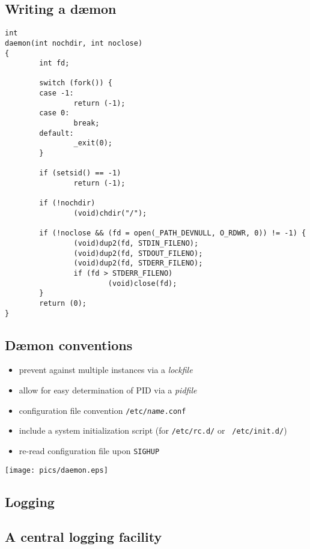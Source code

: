 \documentclass[xga]{xdvislides}
\begin{document}
\subsection{Writing a d\ae mon}
\small
\begin{verbatim}
int
daemon(int nochdir, int noclose)
{
        int fd;

        switch (fork()) {
        case -1:
                return (-1);
        case 0:
                break;
        default:
                _exit(0);
        }

        if (setsid() == -1)
                return (-1);

        if (!nochdir)
                (void)chdir("/");

        if (!noclose && (fd = open(_PATH_DEVNULL, O_RDWR, 0)) != -1) {
                (void)dup2(fd, STDIN_FILENO);
                (void)dup2(fd, STDOUT_FILENO);
                (void)dup2(fd, STDERR_FILENO);
                if (fd > STDERR_FILENO)
                        (void)close(fd);
        }
        return (0);
}
\end{verbatim}
\Normalsize

\subsection{D\ae mon conventions}
\begin{itemize}
	\item prevent against multiple instances via a {\em lockfile}
	\item allow for easy determination of PID via a {\em pidfile}
	\item configuration file convention {\tt /etc/{\em name}.conf}
	\item include a system initialization script (for {\tt /etc/rc.d/} or {\tt
		/etc/init.d/})
	\item re-read configuration file upon {\tt SIGHUP}
\end{itemize}

\vfill
\hfill\texttt{[image: pics/daemon.eps]} \\


\subsection{Logging}

\subsection{A central logging facility}
\end{document}
